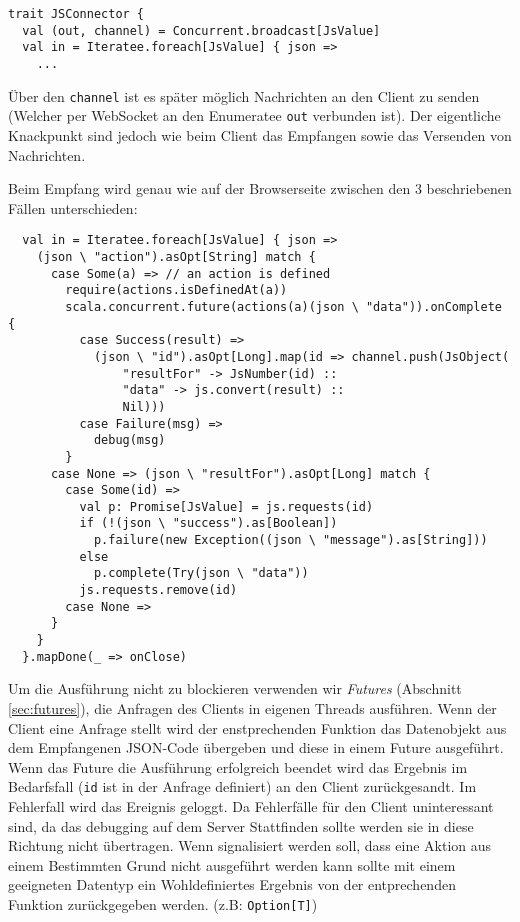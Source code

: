 \begin{lstlisting}
trait JSConnector {
  val (out, channel) = Concurrent.broadcast[JsValue]
  val in = Iteratee.foreach[JsValue] { json =>
    ...
\end{lstlisting}

Über den \texttt{channel} ist es später möglich Nachrichten an den Client zu senden (Welcher per
WebSocket an den Enumeratee \texttt{out} verbunden ist). Der eigentliche Knackpunkt sind jedoch wie
beim Client das Empfangen sowie das Versenden von Nachrichten.

Beim Empfang wird genau wie auf der Browserseite zwischen den 3 beschriebenen Fällen unterschieden:

\begin{lstlisting}
  val in = Iteratee.foreach[JsValue] { json =>    
    (json \ "action").asOpt[String] match {
      case Some(a) => // an action is defined    
        require(actions.isDefinedAt(a))
        scala.concurrent.future(actions(a)(json \ "data")).onComplete {
          case Success(result) =>
            (json \ "id").asOpt[Long].map(id => channel.push(JsObject(
                "resultFor" -> JsNumber(id) ::
                "data" -> js.convert(result) ::
                Nil)))
          case Failure(msg) =>
            debug(msg)
        }
      case None => (json \ "resultFor").asOpt[Long] match {
        case Some(id) =>          
          val p: Promise[JsValue] = js.requests(id)
          if (!(json \ "success").as[Boolean])
            p.failure(new Exception((json \ "message").as[String]))
          else
            p.complete(Try(json \ "data"))
          js.requests.remove(id)
        case None =>
      }
    }
  }.mapDone(_ => onClose)
\end{lstlisting}

Um die Ausführung nicht zu blockieren verwenden wir \textit{Futures} (Abschnitt \ref{sec:futures}),
die Anfragen des Clients in eigenen Threads ausführen. Wenn der Client eine Anfrage stellt wird der
enstprechenden Funktion das Datenobjekt aus dem Empfangenen JSON-Code übergeben und diese in einem
Future ausgeführt. Wenn das Future die Ausführung erfolgreich beendet wird das Ergebnis im
Bedarfsfall (\texttt{id} ist in der Anfrage definiert) an den Client zurückgesandt. Im Fehlerfall
wird das Ereignis geloggt. Da Fehlerfälle für den Client uninteressant sind, da das debugging auf
dem Server Stattfinden sollte werden sie in diese Richtung nicht übertragen. Wenn signalisiert
werden soll, dass eine Aktion aus einem Bestimmten Grund nicht ausgeführt werden kann sollte mit
einem geeigneten Datentyp ein Wohldefiniertes Ergebnis von der entprechenden Funktion zurückgegeben
werden. (z.B: \texttt{Option[T]})

